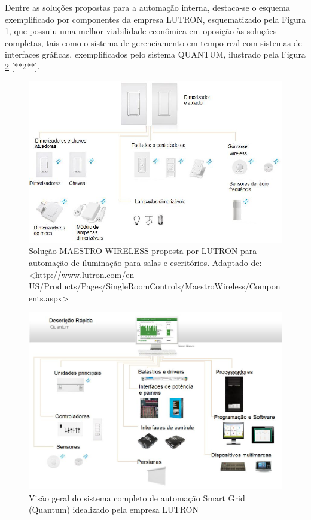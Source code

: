 Dentre as soluções propostas para a automação interna, destaca-se o esquema exemplificado por componentes da empresa LUTRON, esquematizado pela Figura \ref{fig:maestrowireless}, que possuiu uma melhor viabilidade econômica em oposição às soluções completas, tais como o sistema de gerenciamento em tempo real com sistemas de interfaces gráficas, exemplificados pelo sistema QUANTUM, ilustrado pela Figura \ref{fig:sistemaquantum} [**2**]. 
\begin{figure}[!h]
	\centering
	\includegraphics[width=1.0\textwidth]{figuras/maestroWireless.jpeg}
	\caption{Solução MAESTRO WIRELESS proposta por LUTRON para automação de iluminação para salas e  escritórios. Adaptado de: <http://www.lutron.com/en-US/Products/Pages/SingleRoomControls/MaestroWireless/Components.aspx>}
	\label{fig:maestrowireless}
\end{figure}

\begin{figure}[!h]
	\centering
	\includegraphics[width=1.0\textwidth]{figuras/sistemaQuantum.jpeg}
	\caption{Visão geral do sistema completo de automação Smart Grid (Quantum) idealizado pela empresa LUTRON}
	\label{fig:sistemaquantum}
\end{figure}

